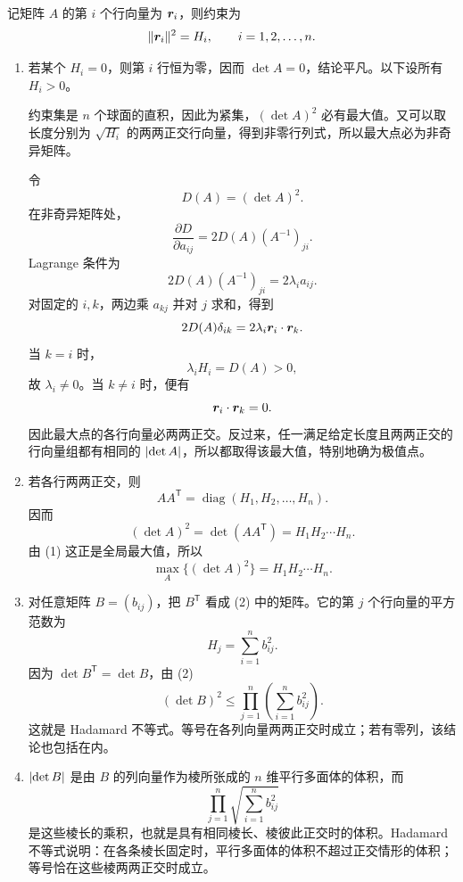 \begin{xsolution}
记矩阵 $A$ 的第 $i$ 个行向量为 $\bm{r}_i$，则约束为
\[
  \lVert\bm{r}_i\rVert^2=H_i,
  \qquad i=1,2,\ldots,n.
\]

\begin{enumerate}[label=(\arabic*)]
  \item 若某个 $H_i=0$，则第 $i$ 行恒为零，因而 $\det A=0$，结论平凡。以下设所有 $H_i>0$。

  约束集是 $n$ 个球面的直积，因此为紧集，$(\det A)^2$ 必有最大值。又可以取长度分别为 $\sqrt{H_i}$ 的两两正交行向量，得到非零行列式，所以最大点必为非奇异矩阵。

  令
  \[
    D(A)=(\det A)^2.
  \]
  在非奇异矩阵处，
  \[
    \frac{\partial D}{\partial a_{ij}}
    =2D(A)(A^{-1})_{ji}.
  \]
  Lagrange 条件为
  \[
    2D(A)(A^{-1})_{ji}=2\lambda_i a_{ij}.
  \]
  对固定的 $i,k$，两边乘 $a_{kj}$ 并对 $j$ 求和，得到
  \[
    2D(A)\delta_{ik}
    =2\lambda_i\bm{r}_i\cdot\bm{r}_k.
  \]
  当 $k=i$ 时，
  \[
    \lambda_iH_i=D(A)>0,
  \]
  故 $\lambda_i\ne0$。当 $k\ne i$ 时，便有
  \[
    \bm{r}_i\cdot\bm{r}_k=0.
  \]
  因此最大点的各行向量必两两正交。反过来，任一满足给定长度且两两正交的行向量组都有相同的 $\lvert\det A\rvert$，所以都取得该最大值，特别地确为极值点。

  \item 若各行两两正交，则
  \[
    AA^{\mathsf T}=\operatorname{diag}(H_1,H_2,\ldots,H_n).
  \]
  因而
  \[
    (\det A)^2
    =\det(AA^{\mathsf T})
    =H_1H_2\cdots H_n.
  \]
  由 (1) 这正是全局最大值，所以
  \[
    \max_A\{(\det A)^2\}=H_1H_2\cdots H_n.
  \]

  \item 对任意矩阵 $B=(b_{ij})$，把 $B^{\mathsf T}$ 看成 (2) 中的矩阵。它的第 $j$ 个行向量的平方范数为
  \[
    H_j=\sum_{i=1}^n b_{ij}^2.
  \]
  因为 $\det B^{\mathsf T}=\det B$，由 (2)
  \[
    (\det B)^2
    \le\prod_{j=1}^n\left(\sum_{i=1}^n b_{ij}^2\right).
  \]
  这就是 Hadamard 不等式。等号在各列向量两两正交时成立；若有零列，该结论也包括在内。

  \item $\lvert\det B\rvert$ 是由 $B$ 的列向量作为棱所张成的 $n$ 维平行多面体的体积，而
  \[
    \prod_{j=1}^n\sqrt{\sum_{i=1}^n b_{ij}^2}
  \]
  是这些棱长的乘积，也就是具有相同棱长、棱彼此正交时的体积。Hadamard 不等式说明：在各条棱长固定时，平行多面体的体积不超过正交情形的体积；等号恰在这些棱两两正交时成立。
\end{enumerate}
\end{xsolution}


